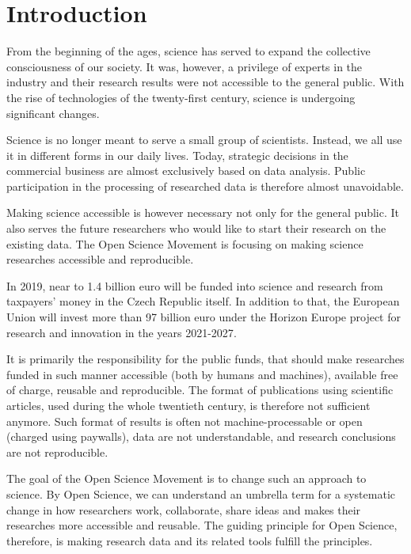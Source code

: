 \chapter{Introduction}\label{cptr:introduction}

From the beginning of the ages, science has served to expand the collective consciousness of our society.
It was, however, a privilege of experts in the industry and their research results were not accessible to the general public.
With the rise of technologies of the twenty-first century, science is undergoing significant changes.

Science is no longer meant to serve a small group of scientists.
Instead, we all use it in different forms in our daily lives.
Today, strategic decisions in the commercial business are almost exclusively based on data analysis.
Public participation in the processing of researched data is therefore almost unavoidable.

Making science accessible is however necessary not only for the general public.
It also serves the future researchers who would like to start their research on the existing data.
The Open Science Movement is focusing on making science researches accessible and reproducible.

In 2019, near to 1.4 billion euro will be funded into science and research from taxpayers' money in the Czech Republic itself\cite{rvvi-budget}.
In addition to that, the European Union will invest more than 97 billion euro under the Horizon Europe project for research and innovation in the years 2021-2027\cite{euc-horizon-budget}.

It is primarily the responsibility for the public funds, that should make researches funded in such manner accessible (both by humans and machines), available free of charge, reusable and reproducible.
The format of publications using scientific articles, used during the whole twentieth century, is therefore not sufficient anymore.
Such format of results is often not machine-processable or open (charged using paywalls), data are not understandable, and research conclusions are not reproducible.

The goal of the Open Science Movement is to change such an approach to science.
By Open Science, we can understand an umbrella term for a systematic change in how researchers work, collaborate, share ideas and makes their researches more accessible and reusable.
The guiding principle for Open Science, therefore, is making research data and its related tools fulfill the  principles.


